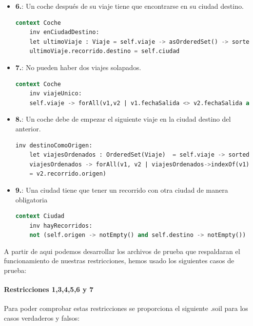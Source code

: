 \documentclass[12pt.a4paper]{article}
\begin{document}
\begin{itemize}
    \item \textbf{6.}: Un coche después de su viaje tiene que encontrarse en su ciudad destino.
    \begin{lstlisting}[style = useEspecifico,language=SQL]
  context Coche
    inv enCiudadDestino:
    let ultimoViaje : Viaje = self.viaje -> asOrderedSet() -> sortedBy(fechaLlegada) -> last() in
    ultimoViaje.recorrido.destino = self.ciudad
    \end{lstlisting}
    
    \item \textbf{7.}: No pueden haber dos viajes solapados.
    \begin{lstlisting}[style = useEspecifico,language=SQL]
  context Coche
    inv viajeUnico:
    self.viaje -> forAll(v1,v2 | v1.fechaSalida <> v2.fechaSalida and (v1.fechaLlegada <= v2.fechaSalida or v2.fechaLlegada <= v1.fechaSalida))
    \end{lstlisting}
    
    \item \textbf{8.}: Un coche debe de empezar el siguiente viaje en la ciudad destino del anterior.
    \begin{lstlisting}[style = useEspecifico,language=SQL]
    inv destinoComoOrigen:
    let viajesOrdenados : OrderedSet(Viaje)  = self.viaje -> sortedBy(v | v.fechaSalida) in 
    viajesOrdenados -> forAll(v1, v2 | viajesOrdenados->indexOf(v1) = viajesOrdenados->indexOf(v2) + 1 implies v1.recorrido.destino 
    = v2.recorrido.origen)
    \end{lstlisting}

    \item \textbf{9.}: Una ciudad tiene que tener un recorrido con otra ciudad de manera obligatoria
    \begin{lstlisting}[style = useEspecifico,language=SQL]
  context Ciudad
    inv hayRecorridos:
    not (self.origen -> notEmpty() and self.destino -> notEmpty())
    \end{lstlisting}
\end{itemize}
\vspace{1.0 cm}
A partir de aqui podemos desarrollar los archivos de prueba que respaldaran el funcionamiento de nuestras restricciones, hemos usado los siguientes casos de prueba:\\\\
\textbf{Restricciones 1,3,4,5,6 y 7}\\\\

Para poder comprobar estas restricciones se proporciona el siguiente .soil para los casos verdaderos y falsos:
\end{document}

